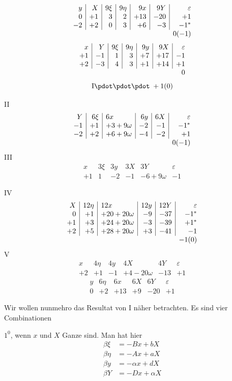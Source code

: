 \[
\begin{array}{r|r|r|r|r|r|r}
y&X&9\xi&9\eta&9x&9Y&\varepsilon\\
0&+1&3&2&+13&-20&+1\\
-2&+2&0&3&+6&-3&-1^{*}\\
\multicolumn{6}{c}{}&0(-1)
\end{array}
\]
\[
\begin{array}{r|r|r|r|r|r|r}
x&Y&9\xi&9\eta&9y&9X&\varepsilon\\
+1&-1&1&3&+7&+17&-1\\
+2&-3&4&3&+1&+14&+1\\
\multicolumn{6}{c}{}&0
\end{array}
\]
\[
\mathrm{I}\pdot\pdot\pdot\;+1(0)
\]

\noindent II
\[
\begin{array}{r|r|l|r|r|r}
Y&6\xi&6x&6y&6X&\varepsilon\\
-1&+1&+3+9\omega&-2&-1&-1^{*}\\
-2&+2&+6+9\omega&-4&-2&+1\\
\multicolumn{5}{c}{}&0(-1)
\end{array}
\]
\noindent III
\[
\begin{array}{r|r|r|r|l|r}
x&3\xi&3y&3X&3Y&\varepsilon\\
+1&1&-2&-1&-6+9\omega&-1
\end{array}
\]

\noindent IV
\[
\begin{array}{r|r|l|r|r|r}
X&12\eta&12x&12y&12Y&\varepsilon\\
0&+1&+20+20\omega&-9&-37&-1^{*}\\
+1&+3&+24+20\omega&-3&-39&+1^{*}\\
+2&+5&+28+20\omega&+3&-41&-1\\
\multicolumn{5}{c}{}&-1(0)
\end{array}
\]
\noindent V
\[
\begin{array}{r|r|r|l|r|r}
x&4\eta&4y&4X&4Y&\varepsilon\\
+2&+1&-1&+4-20\omega&-13&+1
\end{array}
\]
\[
\begin{array}{r|r|r|r|r|r}
y&6\eta&6x&6X&6Y&\varepsilon\\
0&+2&+13&+9&-20&+1
\end{array}
\]

Wir wollen nunmehro das Resultat von I näher betrachten. Es sind vier Combinationen\par
\noindent $1^0$, wenn $x$ und $X$ Ganze sind. Man hat hier
\[
\begin{aligned}
\beta\xi&=-Bx+bX\\
\beta\eta&=-Ax+aX\\
\beta y&=-\alpha x+dX\\
\beta Y&=-Dx+\alpha X
\end{aligned}
\]

